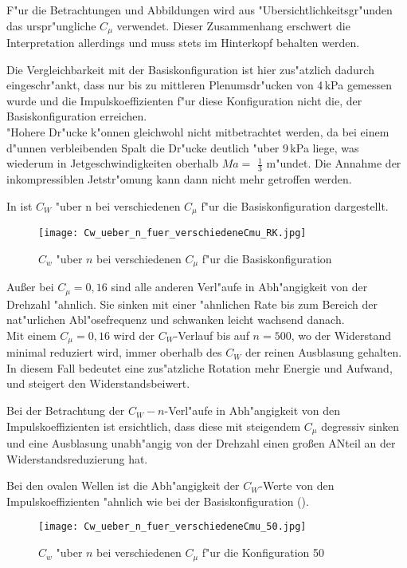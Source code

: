 F"ur die Betrachtungen und Abbildungen wird aus "Ubersichtlichkeitsgr"unden das urspr"ungliche $C_{\mu}$ verwendet. Dieser Zusammenhang erschwert die Interpretation allerdings und muss stets im Hinterkopf behalten werden.

Die Vergleichbarkeit mit der Basiskonfiguration ist hier zus"atzlich dadurch eingeschr"ankt, dass nur bis zu mittleren Plenumsdr"ucken von 4\,kPa gemessen wurde und die Impulskoeffizienten f"ur diese Konfiguration nicht die, der Basiskonfiguration erreichen.\\
"Hohere Dr"ucke k"onnen gleichwohl nicht mitbetrachtet werden, da bei einem d"unnen verbleibenden Spalt die Dr"ucke deutlich "uber 9\,kPa liege, was wiederum in Jetgeschwindigkeiten oberhalb $Ma =$ $\frac{1}{3}$ m"undet. Die Annahme der inkompressiblen Jetstr"omung kann dann nicht mehr getroffen werden.

In  ist $C_{W}$ "uber n bei verschiedenen $C_{\mu}$ f"ur die Basiskonfiguration dargestellt.

\begin{figure}[h]
	\centering
	\texttt{[image: Cw\_ueber\_n\_fuer\_verschiedeneCmu\_RK.jpg]}
	\caption{$C_{w}$ "uber $n$ bei verschiedenen $C_{\mu}$ f"ur die Basiskonfiguration}
	\label{fig:Cw/n bei Cmu RK}
\end{figure}

Au\ss{}er bei $C_{\mu}= 0,16$ sind alle anderen Verl"aufe in Abh"angigkeit von der Drehzahl "ahnlich.
Sie sinken mit einer "ahnlichen Rate bis zum Bereich der nat"urlichen Abl"osefrequenz und schwanken leicht wachsend danach.\\Mit einem $C_{\mu}= 0,16$ wird der $C_{W}$-Verlauf bis auf $n= 500$, wo der Widerstand minimal reduziert wird, immer oberhalb des $C_{W}$ der reinen Ausblasung gehalten. In diesem Fall bedeutet eine zus"atzliche Rotation mehr Energie und Aufwand, und steigert den Widerstandsbeiwert.

Bei der Betrachtung der $C_{W}-n$-Verl"aufe in Abh"angigkeit von den Impulskoeffizienten ist ersichtlich, dass diese mit steigendem $C_{\mu}$ degressiv sinken und eine Ausblasung unabh"angig von der Drehzahl einen gro\ss{}en ANteil an der Widerstandsreduzierung hat.

Bei den ovalen Wellen ist die Abh"angigkeit der $C_{W}$-Werte von den Impulskoeffizienten "ahnlich wie bei der Basiskonfiguration ().
\begin{figure}[h]
	\centering
	\texttt{[image: Cw\_ueber\_n\_fuer\_verschiedeneCmu\_50.jpg]}
	\caption{$C_{w}$ "uber $n$ bei verschiedenen $C_{\mu}$ f"ur die Konfiguration 50}
	\label{fig:Cw/n bei Cmu 50}
\end{figure}

